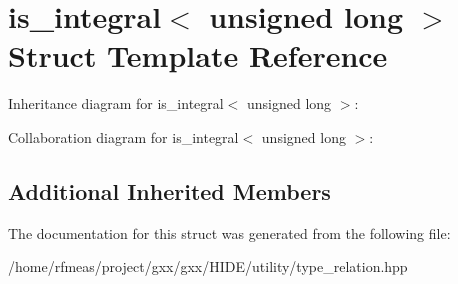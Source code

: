 \hypertarget{structis__integral_3_01unsigned_01long_01_4}{}\section{is\+\_\+integral$<$ unsigned long $>$ Struct Template Reference}
\label{structis__integral_3_01unsigned_01long_01_4}


Inheritance diagram for is\+\_\+integral$<$ unsigned long $>$\+:


Collaboration diagram for is\+\_\+integral$<$ unsigned long $>$\+:
\subsection*{Additional Inherited Members}


The documentation for this struct was generated from the following file\+:\begin{DoxyCompactItemize}
\item 
/home/rfmeas/project/gxx/gxx/\+H\+I\+D\+E/utility/type\+\_\+relation.\+hpp\end{DoxyCompactItemize}
